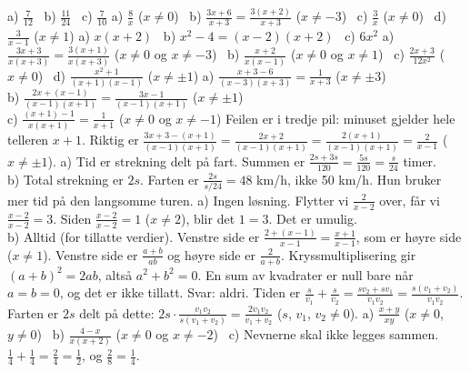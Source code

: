 a) $\frac{7}{12}$ \ b) $\frac{11}{24}$ \ c) $\frac{7}{10}$
 a) $\frac{8}{x}$ ($x \neq 0$) \ b) $\frac{3x+6}{x+3} = \frac{3(x+2)}{x+3}$ ($x \neq -3$) \ c) $\frac{3}{x}$ ($x \neq 0$) \ d) $\frac{3}{x-1}$ ($x \neq 1$)
 a) $x(x+2)$ \ b) $x^2-4 = (x-2)(x+2)$ \ c) $6x^2$
 a) $\frac{3x+3}{x(x+3)} = \frac{3(x+1)}{x(x+3)}$ ($x \neq 0$ og $x \neq -3$) \ b) $\frac{x+2}{x(x-1)}$ ($x \neq 0$ og $x \neq 1$) \ c) $\frac{2x+3}{12x^2}$ ($x \neq 0$) \ d) $\frac{x^2+1}{(x+1)(x-1)}$ ($x \neq \pm 1$)
 a) $\frac{x+3-6}{(x-3)(x+3)} = \frac{1}{x+3}$ ($x \neq \pm 3$)\\
b) $\frac{2x+(x-1)}{(x-1)(x+1)} = \frac{3x-1}{(x-1)(x+1)}$ ($x \neq \pm 1$)\\
c) $\frac{(x+1)-1}{x(x+1)} = \frac{1}{x+1}$ ($x \neq 0$ og $x \neq -1$)
 Feilen er i tredje pil: minuset gjelder hele telleren $x+1$. Riktig er $\frac{3x+3-(x+1)}{(x-1)(x+1)} = \frac{2x+2}{(x-1)(x+1)} = \frac{2(x+1)}{(x-1)(x+1)} = \frac{2}{x-1}$ ($x \neq \pm 1$).
 a) Tid er strekning delt på fart. Summen er $\frac{2s+3s}{120} = \frac{5s}{120} = \frac{s}{24}$ timer.\\
b) Total strekning er $2s$. Farten er $\frac{2s}{s/24} = 48$ km/h, ikke 50 km/h. Hun bruker mer tid på den langsomme turen.
 a) Ingen løsning. Flytter vi $\frac{2}{x-2}$ over, får vi $\frac{x-2}{x-2} = 3$. Siden $\frac{x-2}{x-2} = 1$ ($x \neq 2$), blir det $1 = 3$. Det er umulig.\\
b) Alltid (for tillatte verdier). Venstre side er $\frac{2+(x-1)}{x-1} = \frac{x+1}{x-1}$, som er høyre side ($x \neq 1$).
 Venstre side er $\frac{a+b}{ab}$ og høyre side er $\frac{2}{a+b}$. Kryssmultiplisering gir $(a+b)^2 = 2ab$, altså $a^2+b^2 = 0$.
En sum av kvadrater er null bare når $a = b = 0$, og det er ikke tillatt. Svar: aldri.
 Tiden er $\frac{s}{v_1}+\frac{s}{v_2} = \frac{sv_2+sv_1}{v_1v_2} = \frac{s(v_1+v_2)}{v_1v_2}$. Farten er $2s$ delt på dette: $2s\cdot\frac{v_1v_2}{s(v_1+v_2)} = \frac{2v_1v_2}{v_1+v_2}$ ($s$, $v_1$, $v_2 \neq 0$).
 a) $\frac{x+y}{xy}$ ($x \neq 0$, $y \neq 0$) \ b) $\frac{4-x}{x(x+2)}$ ($x \neq 0$ og $x \neq -2$) \ c) Nevnerne skal ikke legges sammen. $\frac{1}{4}+\frac{1}{4} = \frac{2}{4} = \frac{1}{2}$, og $\frac{2}{8} = \frac{1}{4}$.

